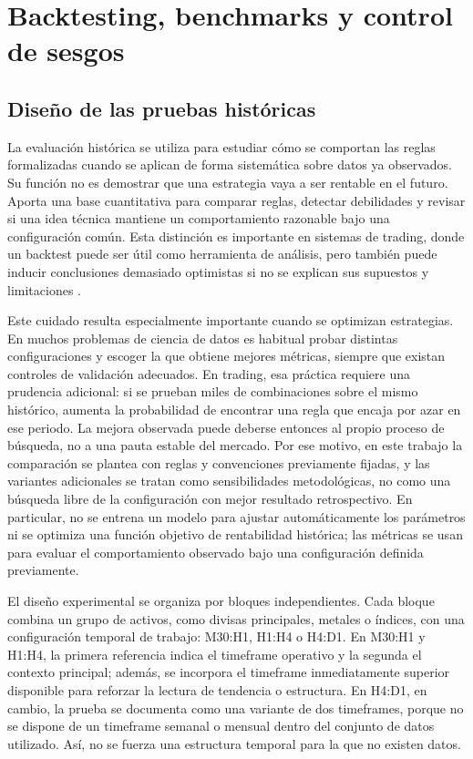 \section{Backtesting, benchmarks y control de sesgos}
\label{sec:backtesting-benchmarks-sesgos}

\subsection{Dise\~no de las pruebas hist\'oricas}
\label{subsec:diseno-pruebas-historicas}

La evaluaci\'on hist\'orica se utiliza para estudiar c\'omo se comportan las
reglas formalizadas cuando se aplican de forma sistem\'atica sobre datos ya
observados. Su funci\'on no es demostrar que una estrategia vaya a ser rentable
en el futuro. Aporta una base cuantitativa para comparar reglas, detectar
debilidades y revisar si una idea t\'ecnica mantiene un comportamiento
razonable bajo una configuraci\'on com\'un. Esta distinci\'on es importante en
sistemas de trading, donde un backtest puede ser \'util como herramienta de
an\'alisis, pero tambi\'en puede inducir conclusiones demasiado optimistas si no
se explican sus supuestos y limitaciones \cite{pardo_2008_trading_strategies,
bailey_etal_2017_backtest_overfitting,lopez_de_prado_2018_afml}.

Este cuidado resulta especialmente importante cuando se optimizan estrategias. En muchos
problemas de ciencia de datos es habitual probar distintas configuraciones y
escoger la que obtiene mejores m\'etricas, siempre que existan controles de
validaci\'on adecuados. En trading, esa pr\'actica requiere una prudencia
adicional: si se prueban miles de combinaciones sobre el mismo hist\'orico,
aumenta la probabilidad de encontrar una regla que encaja por azar en ese
periodo. La mejora observada puede deberse entonces al propio proceso de
b\'usqueda, no a una pauta estable del mercado. Por ese motivo, en este trabajo
la comparaci\'on se plantea con reglas y convenciones previamente fijadas, y las
variantes adicionales se tratan como sensibilidades metodol\'ogicas, no como una
b\'usqueda libre de la configuraci\'on con mejor resultado retrospectivo.
En particular, no se entrena un modelo para ajustar autom\'aticamente los
par\'ametros ni se optimiza una funci\'on objetivo de rentabilidad hist\'orica; las
m\'etricas se usan para evaluar el comportamiento observado bajo una
configuraci\'on definida previamente.

El dise\~no experimental se organiza por bloques independientes. Cada bloque
combina un grupo de activos, como divisas principales, metales o \'indices, con
una configuraci\'on temporal de trabajo: M30:H1, H1:H4 o H4:D1. En M30:H1 y
H1:H4, la primera referencia indica el timeframe operativo y la segunda el contexto
principal; adem\'as, se incorpora el timeframe inmediatamente superior disponible
para reforzar la lectura de tendencia o estructura. En H4:D1, en cambio, la
prueba se documenta como una variante de dos timeframes, porque no se
dispone de un timeframe semanal o mensual dentro del conjunto de datos utilizado.
As\'i, no se fuerza una estructura temporal para la que no existen datos.

